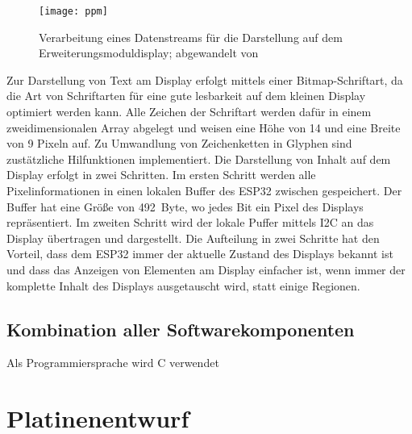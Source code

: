 \begin{figure}[h]
    \centering
    \texttt{[image: ppm]}
    \caption{Verarbeitung eines Datenstreams für die Darstellung auf dem Erweiterungsmoduldisplay; abgewandelt von \cite[S.~37]{ssd1306}}
    \label{fig:ssd1306PixelControl}
\end{figure}

Zur Darstellung von Text am Display erfolgt mittels einer Bitmap-Schriftart, da die Art von Schriftarten für eine gute lesbarkeit auf dem kleinen Display optimiert werden kann. Alle Zeichen der Schriftart werden dafür in einem zweidimensionalen Array abgelegt und weisen eine Höhe von 14 und eine Breite von 9 Pixeln auf. Zu Umwandlung von Zeichenketten in Glyphen sind zustätzliche Hilfunktionen implementiert. Die Darstellung von Inhalt auf dem Display erfolgt in zwei Schritten. Im ersten Schritt werden alle Pixelinformationen in einen lokalen Buffer des ESP32 zwischen gespeichert. Der Buffer hat eine Größe von 492~Byte, wo jedes Bit ein Pixel des Displays repräsentiert. Im zweiten Schritt wird der lokale Puffer mittels \ac{I2C} an das Display übertragen und dargestellt. Die Aufteilung in zwei Schritte hat den Vorteil, dass dem ESP32 immer der aktuelle Zustand des Displays bekannt ist und dass das Anzeigen von Elementen am Display einfacher ist, wenn immer der komplette Inhalt des Displays ausgetauscht wird, statt einige Regionen.

\subsection{Kombination aller Softwarekomponenten}
Als Programmiersprache wird C verwendet




\section{Platinenentwurf}

